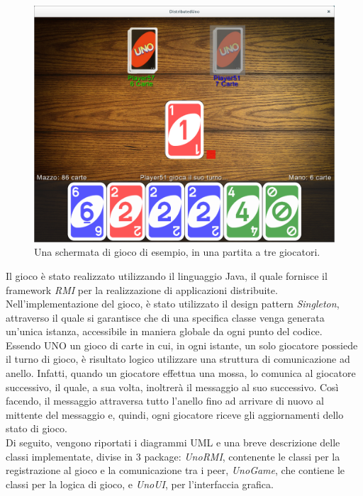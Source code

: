 \documentclass[11pt]{article} %
\begin{document}
\begin{figure}[h]
\centering%
\includegraphics[width=12cm, keepaspectratio]{gameScreen1.png}%
\caption{Una schermata di gioco di esempio, in una partita a tre giocatori.}
\end{figure}

Il gioco è stato realizzato utilizzando il linguaggio Java, il quale fornisce il framework \emph{RMI} per la realizzazione di applicazioni distribuite.
Nell'implementazione del gioco, è stato utilizzato il design pattern \emph{Singleton}, attraverso il quale si garantisce che di una specifica classe venga 
generata un'unica istanza, accessibile in maniera globale da ogni punto del codice.\\
Essendo UNO un gioco di carte in cui, in ogni istante, un solo giocatore possiede il turno di gioco, è risultato logico utilizzare una struttura di comunicazione
ad anello. Infatti, quando un giocatore effettua una mossa, lo comunica al giocatore successivo, il quale, a sua volta, inoltrerà il messaggio al suo successivo.
Così facendo, il messaggio attraversa tutto l'anello fino ad arrivare di nuovo al mittente del messaggio e, quindi, ogni giocatore riceve gli 
aggiornamenti dello stato di gioco.\\
Di seguito, vengono riportati i diagrammi UML e una breve descrizione delle classi implementate, divise in 3 package: \emph{UnoRMI}, contenente le classi per 
la registrazione al gioco e la comunicazione tra i peer, \emph{UnoGame}, che contiene le classi per la logica di gioco, e \emph{UnoUI}, per l'interfaccia 
grafica.
\end{document}
